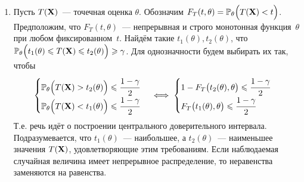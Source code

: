 \begin{enumerate}
    \item Пусть $T(\mathbf{X})$~--- точечная оценка $\theta$. 
        Обозначим $F_{T}(t, \theta)={\operatorname{\operatorname{\mathbb{P}}_{\theta}}\Bigl(T(\mathbf{X})<t\Bigr)}$. 
        Предположим, что $F_{T}(t,\theta)$~--- непрерывная и строго монотонная функция~$\theta$ при любом фиксированном~$t$. 
        Найдём такие $t_1(\theta), t_2(\theta)$, что ${\operatorname{\operatorname{\mathbb{P}}_{\theta}} \Bigl( t_1(\theta) \leqslant T(\mathbf{X}) \leqslant t_2(\theta) \Bigr) \geqslant \gamma}$.
        Для однозначности будем выбирать их так, чтобы
        \begin{equation*}
            \begin{cases}
                \operatorname{\operatorname{\mathbb{P}}_{\theta}} \Bigl( T(\mathbf{X}) > t_2(\theta) \Bigr) \leqslant \cfrac{1 - \gamma}{2} \\ 
                \operatorname{\operatorname{\mathbb{P}}_{\theta}} \Bigl( T(\mathbf{X}) < t_1(\theta) \Bigr) \leqslant \cfrac{1 - \gamma}{2} 
            \end{cases}
            \iff 
            \begin{cases}
                1 - F_{T}\bigl(t_2(\theta), \theta\bigr) \leqslant \cfrac{1 - \gamma}{2} \\
                F_{T}\bigl(t_1(\theta), \theta\bigr) \leqslant \cfrac{1 - \gamma}{2}
            \end{cases}
        \end{equation*}
        Т.е. речь идёт о построении центрального доверительного интервала.
        Подразумевается, что $t_1(\theta)$~--- наибольшее, а $t_2(\theta)$~--- наименьшее значения $T(\mathbf{X})$, удовлетворяющие этим требованиям.
        Если наблюдаемая случайная величина имеет непрерывное распределение, то неравенства заменяются на равенства.
        

\end{enumerate}
